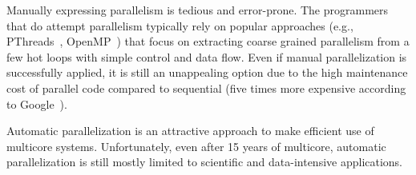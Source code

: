 
Manually expressing parallelism is tedious and error-prone. The programmers that
do attempt parallelism typically rely on popular approaches (e.g.,
PThreads~\cite{pthread:web}, OpenMP~\cite{openmp:web}) that focus on extracting
coarse grained parallelism from a few hot loops with simple control and data
flow. Even if manual parallelization is successfully applied,
it is still an unappealing option due to the high maintenance cost of parallel
code compared to sequential (five times more expensive according to
Google~\cite{google_cite_simone}).
%
%
%
%
%

Automatic parallelization is an attractive approach to make efficient use of
multicore systems.
Unfortunately, even after 15 years of multicore, automatic parallelization is
still mostly limited to scientific and data-intensive applications.

